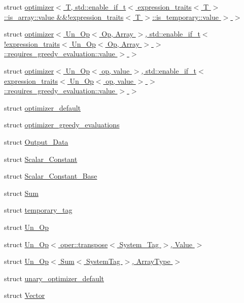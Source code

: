 \begin{DoxyCompactItemize}
\item 
struct \hyperlink{structbc_1_1tensors_1_1exprs_1_1optimizer_3_01T_00_01std_1_1enable__if__t_3_01expression__traits827da0847239e19d0d58ed2226e62750}{optimizer$<$ T, std\+::enable\+\_\+if\+\_\+t$<$ expression\+\_\+traits$<$ T $>$\+::is\+\_\+array\+::value \&\&!expression\+\_\+traits$<$ T $>$\+::is\+\_\+temporary\+::value $>$ $>$}
\item 
struct \hyperlink{structbc_1_1tensors_1_1exprs_1_1optimizer_3_01Un__Op_3_01Op_00_01Array_01_4_00_01std_1_1enable__66b812e276696f18c9c03b5fec72f8f7}{optimizer$<$ Un\+\_\+\+Op$<$ Op, Array $>$, std\+::enable\+\_\+if\+\_\+t$<$!expression\+\_\+traits$<$ Un\+\_\+\+Op$<$ Op, Array $>$ $>$ \+::requires\+\_\+greedy\+\_\+evaluation\+::value $>$ $>$}
\item 
struct \hyperlink{structbc_1_1tensors_1_1exprs_1_1optimizer_3_01Un__Op_3_01op_00_01value_01_4_00_01std_1_1enable__9d73ff143e1f6fbd1ef35f0907cdad0c}{optimizer$<$ Un\+\_\+\+Op$<$ op, value $>$, std\+::enable\+\_\+if\+\_\+t$<$ expression\+\_\+traits$<$ Un\+\_\+\+Op$<$ op, value $>$ $>$ \+::requires\+\_\+greedy\+\_\+evaluation\+::value $>$ $>$}
\item 
struct \hyperlink{structbc_1_1tensors_1_1exprs_1_1optimizer__default}{optimizer\+\_\+default}
\item 
struct \hyperlink{structbc_1_1tensors_1_1exprs_1_1optimizer__greedy__evaluations}{optimizer\+\_\+greedy\+\_\+evaluations}
\item 
struct \hyperlink{structbc_1_1tensors_1_1exprs_1_1Output__Data}{Output\+\_\+\+Data}
\item 
struct \hyperlink{structbc_1_1tensors_1_1exprs_1_1Scalar__Constant}{Scalar\+\_\+\+Constant}
\item 
struct \hyperlink{structbc_1_1tensors_1_1exprs_1_1Scalar__Constant__Base}{Scalar\+\_\+\+Constant\+\_\+\+Base}
\item 
struct \hyperlink{structbc_1_1tensors_1_1exprs_1_1Sum}{Sum}
\item 
struct \hyperlink{structbc_1_1tensors_1_1exprs_1_1temporary__tag}{temporary\+\_\+tag}
\item 
struct \hyperlink{structbc_1_1tensors_1_1exprs_1_1Un__Op}{Un\+\_\+\+Op}
\item 
struct \hyperlink{structbc_1_1tensors_1_1exprs_1_1Un__Op_3_01oper_1_1transpose_3_01System__Tag_01_4_00_01Value_01_4}{Un\+\_\+\+Op$<$ oper\+::transpose$<$ System\+\_\+\+Tag $>$, Value $>$}
\item 
struct \hyperlink{structbc_1_1tensors_1_1exprs_1_1Un__Op_3_01Sum_3_01SystemTag_01_4_00_01ArrayType_01_4}{Un\+\_\+\+Op$<$ Sum$<$ System\+Tag $>$, Array\+Type $>$}
\item 
struct \hyperlink{structbc_1_1tensors_1_1exprs_1_1unary__optimizer__default}{unary\+\_\+optimizer\+\_\+default}
\item 
struct \hyperlink{structbc_1_1tensors_1_1exprs_1_1Vector}{Vector}
\end{DoxyCompactItemize}
